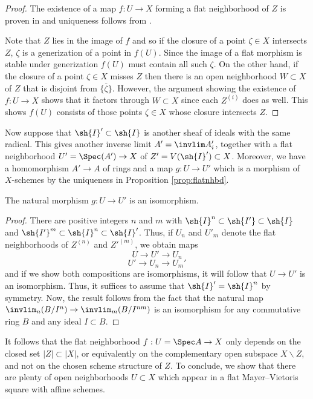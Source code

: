 \documentclass[12pt]{amsart}
\begin{document}
\begin{proof} The existence of a map $f: U \to X$ forming a flat neighborhood of $Z$ is proven in \cite[Thm. 34]{SidRes} and uniqueness follows from \cite[Cor. 1.5]{hall2014coherent}.

Note that $Z$ lies in the image of $f$ and so if the closure of a point $\zeta \in X$ intersects $Z$, $\zeta$ is a generization of a point in $f(U)$. Since the image of a flat morphism is stable under generization $f(U)$ must contain all such $\zeta$. On the other hand, if the closure of a point $\zeta \in X$ misses $Z$ then there is an open neighborhood $W \subset X$ of $Z$ that is disjoint from $\overline{\{\zeta\}}$. However, the argument showing the existence of $f: U \to X$ shows that it factors through $W \subset X$ since each $Z^{(i)}$ does as well. This shows $f(U)$ consists of those points $\zeta \in X$ whose closure intersects $Z$. \end{proof}

\medskip
Now suppose that $\sh{I}' \subset \sh{I}$ is another sheaf of ideals with the same radical.
This gives another inverse limit $A'=\invlim A'_i$, together with a flat neighborhood $U'=\Spec(A') \to X$ of $Z'=V(\sh{I}') \subset X$. 
Moreover, we have a homomorphism $A' \to A$ of rings and a map $g:U \to U'$ which is a morphism of $X$-schemes by the uniqueness in Proposition \ref{prop:flatnhbd}. 

\begin{proposition}
The natural morphism $g: U \to U'$ is an isomorphism. 
\end{proposition}

\begin{proof} There are positive integers $n$ and $m$ with $\sh{I}^n \subset \sh{I'} \subset \sh{I}$ and $\sh{I'}^m \subset \sh{I}^n \subset \sh{I}'$. Thus, if $U_n$ and $U'_m$ denote the flat neighborhoods of $Z^{(n)}$ and $Z'^{(m)}$, we obtain maps
\[U \to U' \to U_n\]
\[U' \to U_n \to U_m'\]
and if we show both compositions are isomorphisms, it will follow that $U \to U'$ is an isomorphism. Thus, it suffices to assume that $\sh{I}'=\sh{I}^n$ by symmetry. Now, the result follows from the fact that the natural map $\invlim_n (B/I^{n}) \to \invlim_m (B/I^{nm})$ is an isomorphism for any commutative ring $B$ and any ideal $I \subset B$.\end{proof}

\medskip
It follows that the flat neighborhood $f:U=\Spec A \to X$ only depends
on the closed set $|Z| \subset |X|$, or equivalently on the complementary open subspace $X \smallsetminus Z$,
and not on the chosen scheme structure of $Z$. To conclude, we show that there are plenty of open neighborhoods $U \subset X$ which appear in a flat Mayer--Vietoris square with affine schemes. 
\end{document}
